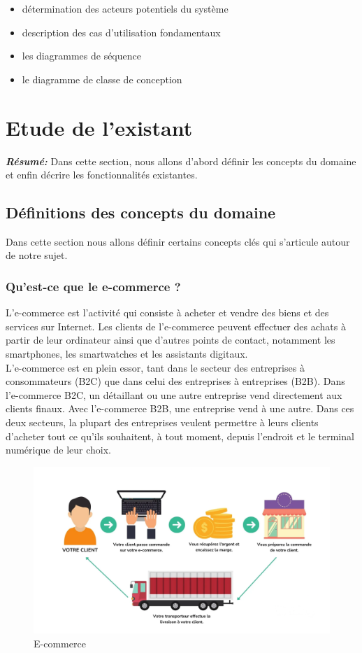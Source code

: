 \documentclass[a4paper, 12pt]{report}
\begin{document}
 \begin{itemize}
    \item détermination des acteurs potentiels du système
    \item description des cas d’utilisation fondamentaux
    \item les diagrammes de séquence
    \item le diagramme de classe de conception
\end{itemize}



\chapter{ Etude de l'existant }
\textit{\textbf{Résumé:} }
Dans cette section, nous allons d'abord définir les concepts du domaine et enfin décrire les fonctionnalités existantes.
\setcounter{minitocdepth}{1}
\minitoc

\section{Définitions des concepts du domaine}
Dans cette section nous allons définir certains concepts clés qui s'articule autour de notre sujet.
\subsection{Qu’est-ce que le e-commerce ?}
L’e-commerce est l’activité qui consiste à acheter et vendre des biens et des services sur Internet. Les clients de l'e-commerce peuvent effectuer des achats à partir de leur ordinateur ainsi que d'autres points de contact, notamment les smartphones, les smartwatches et les assistants digitaux.\\
L'e-commerce est en plein essor, tant dans le secteur des entreprises à consommateurs (B2C) que dans celui des entreprises à entreprises (B2B). Dans l'e-commerce B2C, un détaillant ou une autre entreprise vend directement aux clients finaux. Avec l’e-commerce B2B, une entreprise vend à une autre. Dans ces deux secteurs, la plupart des entreprises veulent permettre à leurs clients d'acheter tout ce qu'ils souhaitent, à tout moment, depuis l'endroit et le terminal numérique de leur choix.
\begin{figure}[H]
    \centering
    \includegraphics[width = 1\linewidth]{img/how-e-commerce.png}
    \caption{E-commerce}
\end{figure}\cite{e-commerce}
\end{document}
